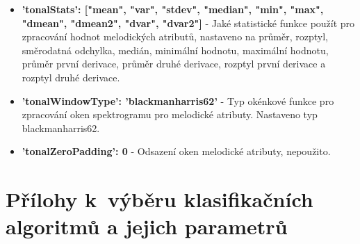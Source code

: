 \begin{itemize}
    \item \textbf{'tonalStats': ["mean", "var", "stdev", "median", "min", "max", "dmean", "dmean2", "dvar", "dvar2"]} - Jaké statistické funkce použít pro zpracování hodnot melodických atributů, nastaveno na průměr, rozptyl, směrodatná odchylka, medián, minimální hodnotu, maximální hodnotu, průměr první derivace, průměr druhé derivace, rozptyl první derivace a rozptyl druhé derivace.
    \item \textbf{'tonalWindowType': 'blackmanharris62'} - Typ okénkové funkce pro zpracování oken spektrogramu pro melodické atributy. Nastaveno typ blackmanharris62.
    \item \textbf{'tonalZeroPadding': 0} - Odsazení oken melodické atributy, nepoužito.
\end{itemize}

\chapter{Přílohy k~výběru klasifikačních algoritmů a jejich parametrů}
\label{prilohy_k_vyberu_klasifikacnich_algoritmu_a_jejich_parametru}

